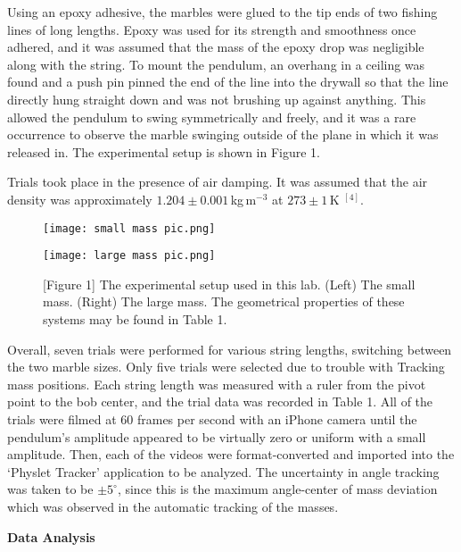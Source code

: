 \documentclass[11pt]{article}
\begin{document}
\begin{multicols}{2}
    Using an epoxy adhesive, the marbles were glued to the tip ends of two fishing lines of long lengths. Epoxy was used for its strength and smoothness once adhered, and it was assumed that the mass of the epoxy drop was negligible along with the string. To mount the pendulum, an overhang in a ceiling was found and a push pin pinned the end of the line into the drywall so that the line directly hung straight down and was not brushing up against anything. This allowed the pendulum to swing symmetrically and freely, and it was a rare occurrence to observe the marble swinging outside of the plane in which it was released in. The experimental setup is shown in Figure 1.
    
    Trials took place in the presence of air damping. It was assumed that the air density was approximately $1.204\pm0.001\,$kg$\,$m$^{-3}$ at $273\pm 1 \,$K $^{[4]}$.
    
    \begin{figure}[H]
        \texttt{[image: small mass pic.png]}
    \end{figure}

    \vspace{-170pt}

    \begin{figure}[H]
        \flushright
        \texttt{[image: large mass pic.png]}
        \caption*{[Figure 1] The experimental setup used in this lab. (Left) The small mass. (Right) The large mass. The geometrical properties of these systems may be found in Table 1.}
    \end{figure}

    Overall, seven trials were performed for various string lengths, switching between the two marble sizes. Only five trials were selected due to trouble with Tracking mass positions. Each string length was measured with a ruler from the pivot point to the bob center, and the trial data was recorded in Table 1. All of the trials were filmed at 60 frames per second with an iPhone camera until the pendulum's amplitude appeared to be virtually zero or uniform with a small amplitude. Then, each of the videos were format-converted and imported into the `Physlet Tracker' application to be analyzed. The uncertainty in angle tracking was taken to be $\pm5^\circ$, since this is the maximum angle-center of mass deviation which was observed in the automatic tracking of the masses.


    \vspace{10pt}

     \selectfont \textbf{Data Analysis}
    

\end{multicols}
\end{document}
